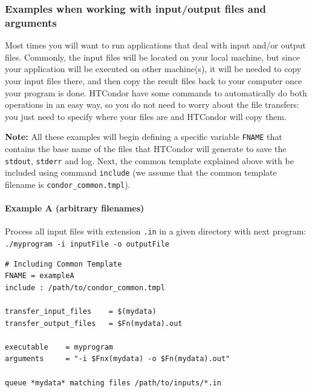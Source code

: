 \documentclass[a4paper,10pt]{article}
\begin{document}
\subsubsection{Examples when working with input/output files and arguments}
\label{sec:orgacd184b}

Most times you will want to run applications that deal with input and/or output
files. Commonly, the input files will be located on your local machine, but
since your application will be executed on other machine(s), it will be needed
to copy your input files there, and then copy the result files back to your
computer once your program is done. HTCondor have some commands to automatically
do both operations in an easy way, so you do not need to worry about the file
transfers: you just need to specify where your files are and HTCondor will copy
them.

\textbf{Note:} All these examples will begin defining a specific variable \texttt{FNAME} that
contains the base name of the files that HTCondor will generate to save the
\texttt{stdout}, \texttt{stderr} and log. Next, the common template explained above with be
included using command \texttt{include} (we assume that the common template filename is
\texttt{condor\_common.tmpl}).

\paragraph{\textbf{Example A} (arbitrary filenames)}
\label{sec:org87f669e}

Process all input files with extension \texttt{.in} in a given directory with next
program: \texttt{./myprogram -i inputFile -o outputFile}

\begin{verbatim}
# Including Common Template
FNAME = exampleA
include : /path/to/condor_common.tmpl

transfer_input_files    = $(mydata)
transfer_output_files   = $Fn(mydata).out

executable    = myprogram
arguments     = "-i $Fnx(mydata) -o $Fn(mydata).out"

queue *mydata* matching files /path/to/inputs/*.in
\end{verbatim}
\end{document}
